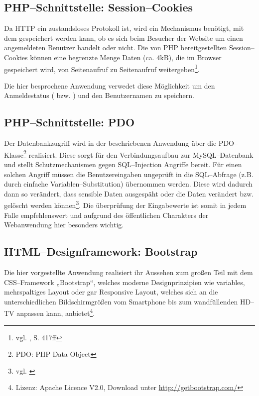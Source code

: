 \subsection{PHP--Schnittstelle: Session--Cookies}

Da HTTP ein zustandsloses Protokoll ist, wird ein Mechanismus benötigt, mit dem gespeichert werden kann, ob es sich beim Besucher der Website um einen angemeldeten Benutzer handelt oder nicht. Die von PHP bereitgestellten Session--Cookies können eine begrenzte Menge Daten (ca. 4kB), die im Browser gespeichert wird, von Seitenaufruf zu Seitenaufruf weitergeben\footnote{vgl. \cite{Theis}, S. 417ff}.

Die hier besprochene Anwendung verwedet diese Möglichkeit um den Anmeldestatus ( bzw. ) und den Benutzernamen zu speichern.

\subsection{PHP--Schnittstelle: PDO}

Der Datenbankzugriff wird in der beschriebenen Anwendung über die PDO--Klasse\footnote{PDO: PHP Data Object} realisiert. Diese sorgt für den Verbindungsaufbau zur MySQL--Datenbank und stellt Schutzmechanismen gegen SQL--Injection Angriffe bereit. Für einen solchen Angriff müssen die Benutzereingaben ungeprüft in die SQL--Abfrage (z.B. durch einfache Variablen--Substitution) übernommen werden. Diese wird dadurch dann so verändert, dass sensible Daten ausgespäht oder die Daten verändert bzw. gelöscht werden können\footnote{vgl. \cite{friedl:sqlinjection}}. Die überprüfung der Eingabewerte ist somit in jedem Falle empfehlenswert und aufgrund des öffentlichen Charakters der Webanwendung hier besonders wichtig.

\subsection{HTML--Designframework: Bootstrap}

Die hier vorgestellte Anwendung realisiert ihr Aussehen zum großen Teil mit dem CSS--Framework „Bootstrap“, welches moderne Designprinzipien wie variables, mehrspaltiges Layout oder gar Responsive Layout, welches sich an die unterschiedlichen Bildschirmgrößen vom Smartphone bis zum wandfüllenden HD--TV anpassen kann, anbietet\footnote{Lizenz: Apache Licence V2.0, Download unter \url{http://getbootstrap.com/}}.

